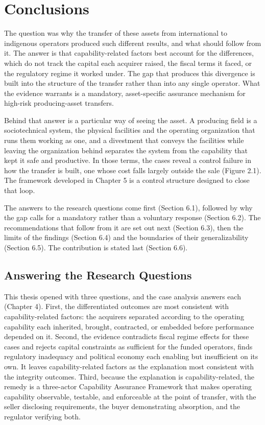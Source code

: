 \hypertarget{conclusions}{%
\chapter{Conclusions}\label{conclusions}}

The question was why the transfer of these assets from international to
indigenous operators produced such different results, and what should
follow from it. The answer is that capability-related factors best
account for the differences, which do not track the capital each
acquirer raised, the fiscal terms it faced, or the regulatory regime it
worked under. The gap that produces this divergence is built into the
structure of the transfer rather than into any single operator. What the
evidence warrants is a mandatory, asset-specific assurance mechanism for
high-risk producing-asset transfers.

Behind that answer is a particular way of seeing the asset. A producing
field is a sociotechnical system, the physical facilities and the
operating organization that runs them working as one, and a divestment
that conveys the facilities while leaving the organization behind
separates the system from the capability that kept it safe and
productive. In those terms, the cases reveal a control failure in how
the transfer is built, one whose cost falls largely outside the sale
(Figure 2.1). The framework developed in Chapter 5 is a control
structure designed to close that loop.

The answers to the research questions come first (Section 6.1), followed
by why the gap calls for a mandatory rather than a voluntary response
(Section 6.2). The recommendations that follow from it are set out next
(Section 6.3), then the limits of the findings (Section 6.4) and the
boundaries of their generalizability (Section 6.5). The contribution is
stated last (Section 6.6).

\hypertarget{answering-the-research-questions}{%
\section{Answering the Research
Questions}\label{answering-the-research-questions}}

This thesis opened with three questions, and the case analysis answers
each (Chapter 4). First, the differentiated outcomes are most consistent
with capability-related factors: the acquirers separated according to
the operating capability each inherited, brought, contracted, or
embedded before performance depended on it. Second, the evidence
contradicts fiscal regime effects for these cases and rejects capital
constraints as sufficient for the funded operators, finds regulatory
inadequacy and political economy each enabling but insufficient on its
own. It leaves capability-related factors as the explanation most
consistent with the integrity outcomes. Third, because the explanation
is capability-related, the remedy is a three-actor Capability Assurance
Framework that makes operating capability observable, testable, and
enforceable at the point of transfer, with the seller disclosing
requirements, the buyer demonstrating absorption, and the regulator
verifying both.

